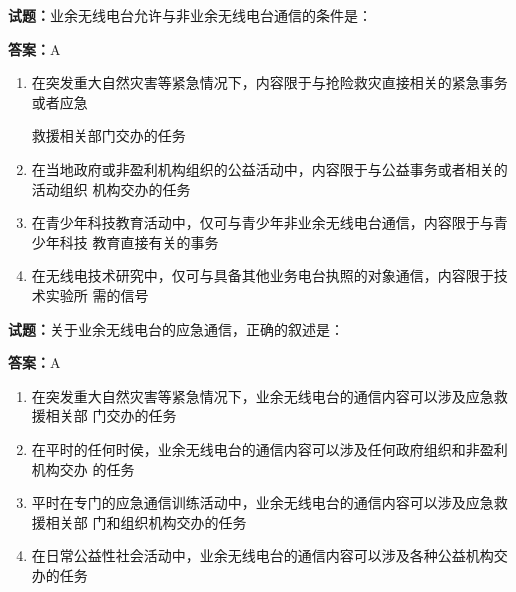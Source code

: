 \documentclass{ctexbook}
\begin{document}




\vspace{1em}

\textbf{试题：}业余无线电台允许与非业余无线电台通信的条件是： 

\textbf{答案：}A 

\begin{enumerate}[leftmargin=3em]
  \item 在突发重大自然灾害等紧急情况下，内容限于与抢险救灾直接相关的紧急事务或者应急


救援相关部门交办的任务 

  \item 在当地政府或非盈利机构组织的公益活动中，内容限于与公益事务或者相关的活动组织
机构交办的任务 

  \item 在青少年科技教育活动中，仅可与青少年非业余无线电台通信，内容限于与青少年科技
教育直接有关的事务 

  \item 在无线电技术研究中，仅可与具备其他业务电台执照的对象通信，内容限于技术实验所
需的信号 

\end{enumerate}





\vspace{1em}

\textbf{试题：}关于业余无线电台的应急通信，正确的叙述是： 

\textbf{答案：}A 

\begin{enumerate}[leftmargin=3em]
  \item 在突发重大自然灾害等紧急情况下，业余无线电台的通信内容可以涉及应急救援相关部
门交办的任务 

  \item 在平时的任何时侯，业余无线电台的通信内容可以涉及任何政府组织和非盈利机构交办
的任务 

  \item 平时在专门的应急通信训练活动中，业余无线电台的通信内容可以涉及应急救援相关部
门和组织机构交办的任务 

  \item 在日常公益性社会活动中，业余无线电台的通信内容可以涉及各种公益机构交办的任务 

\end{enumerate}
\end{document}
